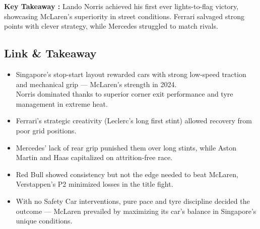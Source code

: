 \textbf{Key Takeaway :} Lando Norris achieved his first ever lights-to-flag victory, showcasing McLaren’s superiority in street conditions. Ferrari salvaged strong points with clever strategy, while Mercedes struggled to match rivals.

\subsection{Link \& Takeaway}

\begin{itemize}
    \item Singapore’s stop-start layout rewarded cars with strong low-speed traction and mechanical grip — McLaren’s strength in 2024. \\
    Norris dominated thanks to superior corner exit performance and tyre management in extreme heat.
    \item Ferrari’s strategic creativity (Leclerc’s long first stint) allowed recovery from poor grid positions. 
    \item Mercedes’ lack of rear grip punished them over long stints, while Aston Martin and Haas capitalized on attrition-free race. 
    \item Red Bull showed consistency but not the edge needed to beat McLaren, Verstappen’s P2 minimized losses in the title fight.
    \item With no Safety Car interventions, pure pace and tyre discipline decided the outcome — McLaren prevailed by maximizing its car’s balance in Singapore’s unique conditions.
\end{itemize}

